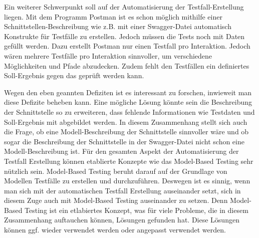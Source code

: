 \documentclass{llncs}
\begin{document}
Ein weiterer Schwerpunkt soll auf der Automatisierung der Testfall-Erstellung liegen. Mit dem Programm Postman ist es schon möglich mithilfe einer Schnittstellen-Beschreibung wie z.B. mit einer Swagger-Datei automatisch Konstrukte für Testfälle zu erstellen. Jedoch müssen die Tests noch mit Daten gefüllt werden. Dazu erstellt Postman nur einen Testfall pro Interaktion. Jedoch wären mehrere Testfälle pro Interaktion sinnvoller, um verschiedene Möglichkeiten und Pfade abzudecken. Zudem fehlt den Testfällen ein definiertes Soll-Ergebnis gegen das geprüft werden kann. 

Wegen den eben geannten Defiziten ist es interessant zu forschen, inwieweit man diese Defizite beheben kann. Eine mögliche Lösung könnte sein die Beschreibung der Schnittstelle so zu erweiteren, dass fehlende Informationen wie Testdaten und Soll-Ergebnis mit abgebildet werden. In diesem Zusammenhang stellt sich auch die Frage, ob eine Modell-Beschreibung der Schnittstelle sinnvoller wäre und ob sogar die Beschreibung der Schnittstelle in der Swagger-Datei nicht schon eine Modell-Beschreibung ist. Für den gesamten Aspekt der Automatisierung der Testfall Erstellung können etablierte Konzepte wie das Model-Based Testing sehr nützlich sein. Model-Based Testing beruht darauf auf der Grundlage von Modellen Testfälle zu erstellen und durchzuführen. Deswegen ist es sinnig, wenn man sich mit der automatischen Testfall Erstellung auseinander setzt, sich in diesem Zuge auch mit Model-Based Testing auseinander zu setzen. Denn Model-Based Testing ist ein etlabiertes Konzept, was für viele Probleme, die in diesem Zusammenhang auftauchen können, Lösungen gefunden hat. Diese Lösungen können ggf. wieder verwendet werden oder angepasst verwendet werden. 



\end{document}
